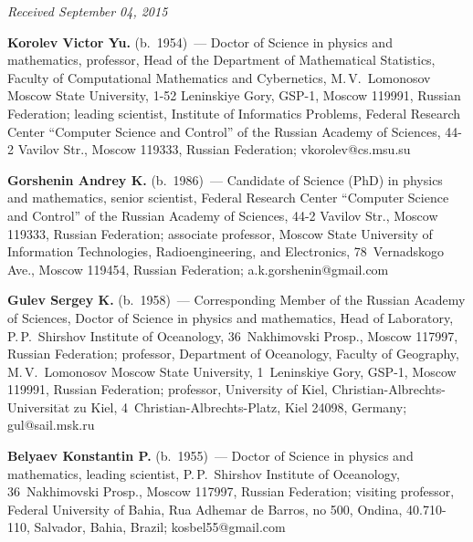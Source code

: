 \vspace*{-3pt}

\hfill{\small\textit{Received September 04, 2015}}

\Contr

\noindent
\textbf{Korolev Victor Yu.} (b.\ 1954)~---
Doctor of Science in physics and mathematics, professor, 
Head of the Department of Mathematical Statistics, Faculty of Computational 
Mathematics and Cybernetics, M.\,V.~Lomonosov Moscow State University, 
1-52 Leninskiye Gory, GSP-1, Moscow 119991, Russian Federation; 
leading scientist, Institute of Informatics Problems, Federal Research Center 
``Computer Science and Control'' of the Russian Academy of Sciences, 
44-2 Vavilov Str., Moscow 119333, Russian Federation; vkorolev@cs.msu.su


\vspace*{3pt}

\noindent
\textbf{Gorshenin Andrey K.}  (b.\ 1986)~---
Candidate of Science (PhD) in physics and mathematics, senior scientist, 
Federal Research Center 
``Computer Science and Control'' of the Russian Academy of Sciences, 
44-2 Vavilov Str., Moscow 119333, Russian Federation; associate professor, 
Moscow State University of Information Technologies, Radioengineering,
and Electronics, 78~Vernadskogo Ave., Moscow 119454, 
Russian Federation;  a.k.gorshenin@gmail.com


\vspace*{3pt}

\noindent
\textbf{Gulev Sergey K.} (b.\ 1958)~---
Corresponding Member of the Russian Academy of Sciences, Doctor of Science 
in physics and mathematics, Head of Laboratory, P.\,P.~Shirshov Institute 
of Oceanology, 36~Nakhimovski Prosp., Moscow 117997, Russian Federation; 
professor, Department of Oceanology, Faculty of Geography,
M.\,V.~Lomonosov Moscow State University, 1~Leninskiye Gory, GSP-1,
Moscow 119991, Russian Federation; 
professor, University of Kiel, Christian-Albrechts-Universit$\ddot{\mbox{a}}$t 
zu Kiel, 4~Christian-Albrechts-Platz, Kiel 24098, Germany; gul@sail.msk.ru

\vspace*{3pt}

\noindent
\textbf{Belyaev Konstantin P.} (b.\ 1955)~---
Doctor of Science in physics and mathematics, leading scientist, 
P.\,P.~Shirshov Institute of Oceanology, 36~Nakhimovski Prosp., 
Moscow 117997, Russian Federation; visiting professor, 
Federal University of Bahia, Rua Adhemar de Barros, no 500, Ondina, 40.710-110, 
Salvador, Bahia, Brazil; kosbel55@gmail.com
\label{end\stat}


\renewcommand{\bibname}{\protect\rm Литература}